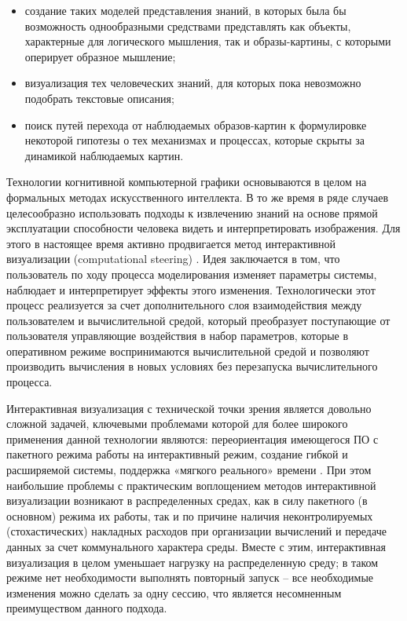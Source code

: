 \begin{itemize}
\item	создание таких моделей представления знаний, в которых была бы возможность однообразными средствами представлять как объекты, характерные для логического мышления, так и образы-картины, с которыми оперирует образное мышление;
\item	визуализация тех человеческих знаний, для которых пока невозможно подобрать текстовые описания;
\item	поиск путей перехода от наблюдаемых образов-картин к формулировке некоторой гипотезы о тех механизмах и процессах, которые скрыты за динамикой наблюдаемых картин.
\end{itemize}

Технологии когнитивной компьютерной графики основываются в целом на формальных методах искусственного интеллекта. В то же время в ряде случаев целесообразно использовать подходы к извлечению знаний на основе прямой эксплуатации способности человека видеть и интерпретировать изображения. Для этого в настоящее время активно продвигается метод интерактивной визуализации (computational steering) \citep{dk66}\citep{dk67}. Идея заключается в том, что пользователь по ходу процесса моделирования изменяет параметры системы, наблюдает и интерпретирует эффекты этого изменения. Технологически этот процесс реализуется за счет дополнительного слоя взаимодействия между пользователем и вычислительной средой, который преобразует поступающие от пользователя управляющие воздействия в набор параметров, которые в оперативном режиме воспринимаются вычислительной средой и позволяют производить вычисления в новых условиях без перезапуска вычислительного процесса.

Интерактивная визуализация с технической точки зрения является довольно сложной задачей, ключевыми проблемами которой для более широкого применения данной технологии являются: переориентация имеющегося ПО с пакетного режима работы на интерактивный режим, создание гибкой и расширяемой системы, поддержка «мягкого реального» времени \citep{dk68}. При этом наибольшие проблемы с практическим воплощением методов интерактивной визуализации возникают в распределенных средах, как в силу пакетного (в основном) режима их работы, так и по причине наличия неконтролируемых (стохастических) накладных расходов при организации вычислений и передаче данных за счет коммунального характера среды. Вместе с этим, интерактивная визуализация в целом уменьшает нагрузку на распределенную среду; в таком режиме нет необходимости выполнять повторный запуск – все необходимые изменения можно сделать за одну сессию, что является несомненным преимуществом данного подхода.

